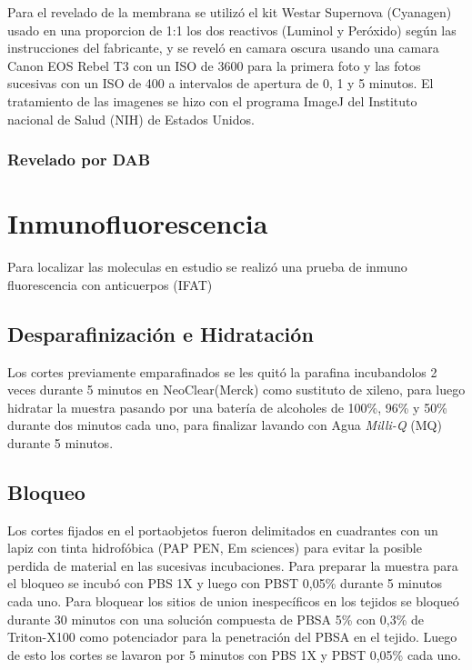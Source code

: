 \documentclass[12pt,a4paper,oneside]{scrbook}
\begin{document}
Para el revelado de la membrana se utilizó el kit Westar Supernova
(Cyanagen) usado en una proporcion de 1:1 los dos reactivos (Luminol y
Peróxido) según las instrucciones del fabricante, y se reveló en camara
oscura usando una camara Canon EOS Rebel T3 con un ISO de 3600 para la
primera foto y las fotos sucesivas con un ISO de 400 a intervalos de
apertura de 0, 1 y 5 minutos. El tratamiento de las imagenes se hizo con
el programa ImageJ del Instituto nacional de Salud (NIH) de Estados
Unidos.

\subsubsection{Revelado por DAB}

\clearpage

\section{Inmunofluorescencia}\label{inmunofluorescencia}

Para localizar las moleculas en estudio se realizó una prueba de inmuno
fluorescencia con anticuerpos (IFAT)

\subsection{Desparafinización e
Hidratación}\label{desparafinizaciuxf3n-e-hidrataciuxf3n}

Los cortes previamente emparafinados se les quitó la parafina
incubandolos 2 veces durante 5 minutos en
NeoClear\textregistered (Merck) como sustituto de xileno, para luego
hidratar la muestra pasando por una batería de alcoholes de 100\%, 96\%
y 50\% durante dos minutos cada uno, para finalizar lavando con Agua
\emph{Milli-Q} (MQ) durante 5 minutos.

\subsection{Bloqueo}\label{bloqueo-1}

Los cortes fijados en el portaobjetos fueron delimitados en cuadrantes
con un lapiz con tinta hidrofóbica (PAP PEN, Em sciences) para evitar la
posible perdida de material en las sucesivas incubaciones. Para preparar
la muestra para el bloqueo se incubó con PBS 1X y luego con PBST 0,05\%
durante 5 minutos cada uno. Para bloquear los sitios de union
inespecíficos en los tejidos se bloqueó durante 30 minutos con una
solución compuesta de PBSA 5\% con 0,3\% de Triton-X100 como potenciador
para la penetración del PBSA en el tejido. Luego de esto los cortes se
lavaron por 5 minutos con PBS 1X y PBST 0,05\% cada uno.
\end{document}
